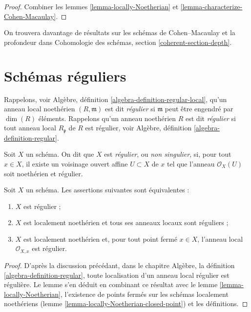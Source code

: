 \begin{proof}
Combiner les lemmes \ref{lemma-locally-Noetherian}
et \ref{lemma-characterize-Cohen-Macaulay}.
\end{proof}

\noindent
On trouvera davantage de résultats sur les schémas de Cohen--Macaulay et la profondeur
dans Cohomologie des schémas, section \ref{coherent-section-depth}.








\section{Schémas réguliers}
\label{section-regular}

\noindent
Rappelons, voir Algèbre, définition \ref{algebra-definition-regular-local},
qu'un anneau local noethérien $(R, \mathfrak m)$ est
dit {\it régulier} si $\mathfrak m$ peut être engendré
par $\dim(R)$ éléments.
Rappelons qu'un anneau noethérien $R$ est dit {\it régulier} si
tout anneau local $R_{\mathfrak p}$ de $R$ est
régulier, voir Algèbre, définition \ref{algebra-definition-regular}.

\begin{definition}
\label{definition-regular}
Soit $X$ un schéma. On dit que $X$ est {\it régulier}, ou {\it non singulier},
si, pour tout $x \in X$, il existe un voisinage ouvert affine
$U \subset X$ de $x$ tel que l'anneau $\mathcal{O}_X(U)$ soit
noethérien et régulier.
\end{definition}

\begin{lemma}
\label{lemma-characterize-regular}
Soit $X$ un schéma. Les assertions suivantes sont équivalentes :
\begin{enumerate}
\item $X$ est régulier ;
\item $X$ est localement noethérien et tous ses anneaux locaux sont
réguliers ;
\item $X$ est localement noethérien et, pour tout point fermé $x \in X$,
l'anneau local $\mathcal{O}_{X, x}$ est régulier.
\end{enumerate}
\end{lemma}

\begin{proof}
D'après la discussion précédant, dans le chapitre Algèbre, la définition
\ref{algebra-definition-regular}, toute localisation d'un anneau
local régulier est régulière. Le lemme s'en déduit en
combinant ce résultat avec le lemme \ref{lemma-locally-Noetherian},
l'existence de points fermés
sur les schémas localement noethériens
(lemme \ref{lemma-locally-Noetherian-closed-point}) et
les définitions.
\end{proof}

